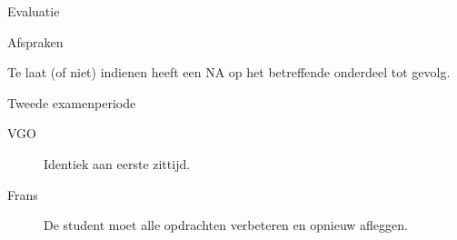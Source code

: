 \documentclass{studiewijzer}
\begin{document}
\begin{categorybox}{Evaluatie}
\begin{category}{Afspraken}
\begin{items}
            \item Te laat (of niet) indienen heeft een NA op het betreffende onderdeel tot gevolg.
        \end{items}
    \end{category}
    \categoryseparator
    \begin{category}{Tweede examenperiode}
        \begin{description}
            \item[VGO] Identiek aan eerste zittijd.
            \item[Frans] De student moet alle opdrachten verbeteren en opnieuw afleggen.
        \end{description}
    \end{category}
\end{categorybox}
\end{document}
